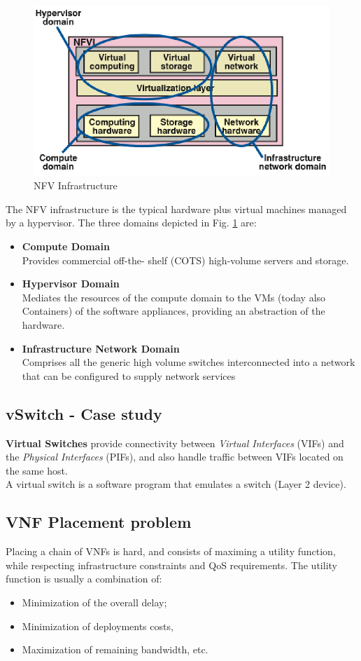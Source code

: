 \begin{figure}[htbp]
   \centering
   \includegraphics{images/NFV_infr.png}
   \caption{NFV Infrastructure}
   \label{fig:NFV_infr}
\end{figure}
The NFV infrastructure is the typical hardware plus virtual machines managed by a hypervisor.
The three domains depicted in Fig. \ref{fig:NFV_infr} are:
\begin{itemize}
   \item \textbf{Compute Domain}\\
   Provides commercial off-the- shelf (COTS) high-volume servers and storage.
   \item \textbf{Hypervisor Domain}\\
   Mediates the resources of the compute domain to the VMs (today also Containers) of the software appliances, providing an abstraction of the hardware.
   \item \textbf{Infrastructure Network Domain}\\
   Comprises all the generic high volume switches interconnected into a network that can be configured to supply network services
\end{itemize}

\subsection{vSwitch - Case study}
\textbf{Virtual Switches} provide connectivity between \textit{Virtual Interfaces} (VIFs) and the \textit{Physical Interfaces} (PIFs), and also handle traffic between VIFs located on the same host.\\
A virtual switch is a software program that emulates a switch (Layer 2 device).

\subsection{VNF Placement problem}
Placing a chain of VNFs is hard, and consists of maximing a utility function, while respecting infrastructure constraints and QoS requirements. The utility function is usually a combination of:
\begin{itemize}
   \item Minimization of the overall delay;
   \item Minimization of deployments costs,
   \item Maximization of remaining bandwidth, etc.
\end{itemize}

